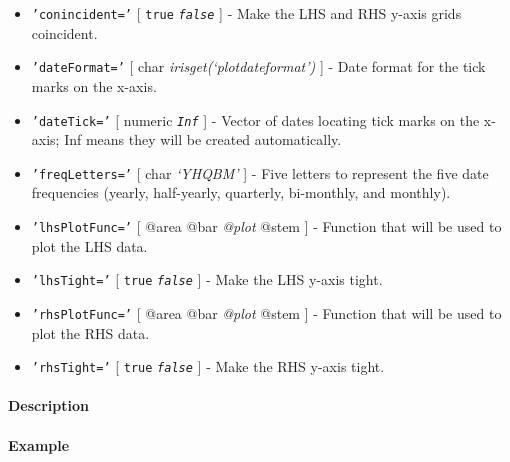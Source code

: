  \begin{itemize}
 \item
   \texttt{'conincident='} {[} \texttt{true} \textbar{}
   \emph{\texttt{false}} {]} - Make the LHS and RHS y-axis grids
   coincident.
 \item
   \texttt{'dateFormat='} {[} char \textbar{}
   \emph{irisget(`plotdateformat')} {]} - Date format for the tick marks
   on the x-axis.
 \item
   \texttt{'dateTick='} {[} numeric \textbar{} \emph{\texttt{Inf}} {]} -
   Vector of dates locating tick marks on the x-axis; Inf means they will
   be created automatically.
 \item
   \texttt{'freqLetters='} {[} char \textbar{} \emph{`YHQBM'} {]} - Five
   letters to represent the five date frequencies (yearly, half-yearly,
   quarterly, bi-monthly, and monthly).
 \item
   \texttt{'lhsPlotFunc='} {[} @area \textbar{} @bar \textbar{}
   \emph{@plot} \textbar{} @stem {]} - Function that will be used to plot
   the LHS data.
 \item
   \texttt{'lhsTight='} {[} \texttt{true} \textbar{}
   \emph{\texttt{false}} {]} - Make the LHS y-axis tight.
 \item
   \texttt{'rhsPlotFunc='} {[} @area \textbar{} @bar \textbar{}
   \emph{@plot} \textbar{} @stem {]} - Function that will be used to plot
   the RHS data.
 \item
   \texttt{'rhsTight='} {[} \texttt{true} \textbar{}
   \emph{\texttt{false}} {]} - Make the RHS y-axis tight.
 \end{itemize}
 
 \paragraph{Description}
 
 \paragraph{Example}


